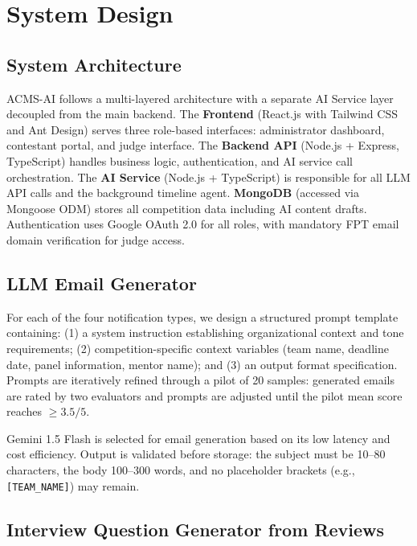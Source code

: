 \documentclass[runningheads]{llncs}
\begin{document}
\section{System Design}

\subsection{System Architecture}

ACMS-AI follows a multi-layered architecture with a separate AI Service layer decoupled from the main backend. The \textbf{Frontend} (React.js with Tailwind CSS and Ant Design) serves three role-based interfaces: administrator dashboard, contestant portal, and judge interface. The \textbf{Backend API} (Node.js + Express, TypeScript) handles business logic, authentication, and AI service call orchestration. The \textbf{AI Service} (Node.js + TypeScript) is responsible for all LLM API calls and the background timeline agent. \textbf{MongoDB} (accessed via Mongoose ODM) stores all competition data including AI content drafts. Authentication uses Google OAuth 2.0 for all roles, with mandatory FPT email domain verification for judge access.

\subsection{LLM Email Generator}

For each of the four notification types, we design a structured prompt template containing: (1) a system instruction establishing organizational context and tone requirements; (2) competition-specific context variables (team name, deadline date, panel information, mentor name); and (3) an output format specification. Prompts are iteratively refined through a pilot of 20 samples: generated emails are rated by two evaluators and prompts are adjusted until the pilot mean score reaches $\geq 3.5/5$.

Gemini 1.5 Flash is selected for email generation based on its low latency and cost efficiency. Output is validated before storage: the subject must be 10--80 characters, the body 100--300 words, and no placeholder brackets (e.g., \texttt{[TEAM\_NAME]}) may remain.

\subsection{Interview Question Generator from Reviews}
\end{document}
